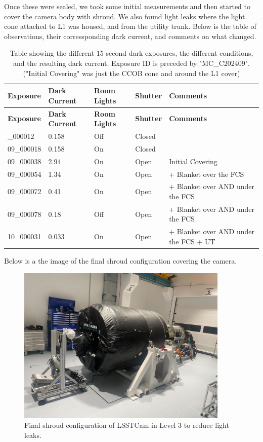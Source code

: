 Once these were sealed, we took some initial measurements and then
started to cover the camera body with shroud. We also found light leaks
where the light cone attached to L1 was housed, and from the utility
trunk. Below is the table of observations, their corressponding dark
current, and comments on what changed.

\label{light_leak}

\begin{longtable}{|l|l|l|l|l|}
\caption{Table showing the different 15 second dark exposures, the different conditions, and the resulting dark current.
Exposure ID is preceded by "MC\_C202409".  ("Initial Covering" was just the CCOB cone and around the L1 cover)} \\
\hline
\textbf{Exposure} & \textbf{Dark Current} & \textbf{Room Lights} & \textbf{Shutter} & \textbf{Comments} \\
\hline
\endfirsthead
\hline
\textbf{Exposure} & \textbf{Dark Current} & \textbf{Room Lights} & \textbf{Shutter} & \textbf{Comments} \\
\hline
\endhead
\hline
\endfoot
\hline
09\_000012 & 0.158 & Off & Closed & \\
09\_000018 & 0.158 & On & Closed & \\
09\_000038 & 2.94 & On & Open & Initial Covering  \\
09\_000054 & 1.34 & On & Open &  + Blanket over the FCS \\
09\_000072 & 0.41 & On & Open &  + Blanket over AND under the FCS \\
09\_000078 & 0.18 & Off & Open & + Blanket over AND under the FCS \\
10\_000031 & 0.033 & On & Open &  + Blanket over AND under the FCS + UT \\
\end{longtable}


Below is a the image of the final shroud configuration covering the
camera.

\begin{figure}
\centering
\includegraphics[width=0.9\textwidth]{sections/figures/Camera_Shroud.jpg}
\caption{Final shroud configuration of LSSTCam in Level 3 to reduce
light leaks.}
\end{figure}


